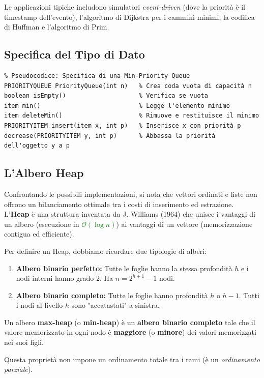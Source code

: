 \documentclass[12pt, a4paper]{article}
\begin{document}
Le applicazioni tipiche includono simulatori \textit{event-driven} (dove la priorità è il timestamp dell'evento), l'algoritmo di Dijkstra per i cammini minimi, la codifica di Huffman e l'algoritmo di Prim.

\subsection{Specifica del Tipo di Dato}
\begin{verbatim}
% Pseudocodice: Specifica di una Min-Priority Queue
PRIORITYQUEUE PriorityQueue(int n)   % Crea coda vuota di capacità n
boolean isEmpty()                    % Verifica se vuota
item min()                           % Legge l'elemento minimo
item deleteMin()                     % Rimuove e restituisce il minimo
PRIORITYITEM insert(item x, int p)   % Inserisce x con priorità p
decrease(PRIORITYITEM y, int p)      % Abbassa la priorità dell'oggetto y a p
\end{verbatim}

\subsection{L'Albero Heap}
Confrontando le possibili implementazioni, si nota che vettori ordinati e liste non offrono un bilanciamento ottimale tra i costi di inserimento ed estrazione. L'\textbf{Heap} è una struttura inventata da J. Williams (1964) che unisce i vantaggi di un albero (esecuzione in \textcolor{green}{$\mathcal{O}(\log n)$}) ai vantaggi di un vettore (memorizzazione contigua ed efficiente).

Per definire un Heap, dobbiamo ricordare due tipologie di alberi:
\begin{enumerate}
\item \textbf{Albero binario perfetto:} Tutte le foglie hanno la stessa profondità $h$ e i nodi interni hanno grado 2. Ha $n = 2^{h+1}-1$ nodi.
\item \textbf{Albero binario completo:} Tutte le foglie hanno profondità $h$ o $h-1$. Tutti i nodi al livello $h$ sono "accatastati" a sinistra.
\end{enumerate}

\begin{tcolorbox}[colback=lightergray!10, colframe=tocsec, title=\textbf{Proprietà Heap}]
Un albero \textbf{max-heap} (o \textbf{min-heap}) è un \textbf{albero binario completo} tale che il valore memorizzato in ogni nodo è \textbf{maggiore} (o \textbf{minore}) dei valori memorizzati nei suoi figli.
\end{tcolorbox}
Questa proprietà non impone un ordinamento totale tra i rami (è un \textit{ordinamento parziale}).
\end{document}
